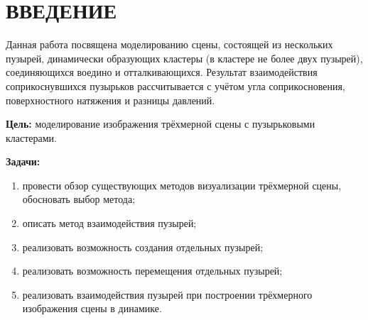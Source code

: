 \chapter*{ВВЕДЕНИЕ}
Данная работа посвящена моделированию сцены, состоящей из нескольких пузырей, динамически образующих кластеры (в кластере не более двух пузырей), соединяющихся воедино и отталкивающихся. Результат взаимодействия соприкоснувшихся пузырьков рассчитывается с учётом угла соприкосновения, поверхностного натяжения и разницы давлений.

\textbf{Цель:} моделирование изображения трёхмерной сцены с пузырьковыми кластерами.

\textbf{Задачи:}
\begin{enumerate}[label={\arabic*)}]
	\item провести обзор существующих методов визуализации трёхмерной сцены, обосновать выбор метода;
	\item описать метод взаимодействия пузырей;
	\item реализовать возможность создания отдельных пузырей;
	\item реализовать возможность перемещения отдельных пузырей;
	\item реализовать взаимодействия пузырей при построении трёхмерного изображения сцены в динамике.
\end{enumerate}